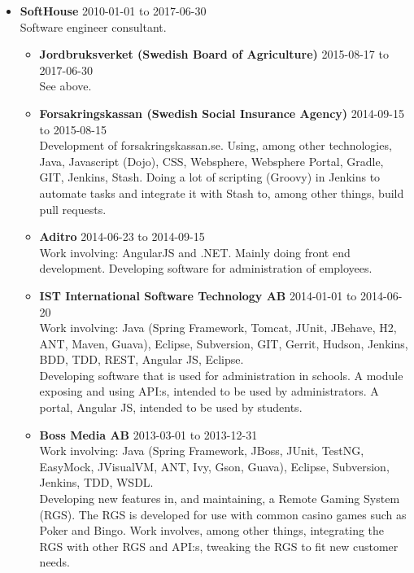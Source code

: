 \documentclass[a4paper]{article}
\begin{document}
\begin{itemize}
 \item \textbf{SoftHouse} 2010-01-01 to 2017-06-30 \\
 Software engineer consultant.
 \begin{itemize}
  \item \textbf{Jordbruksverket (Swedish Board of Agriculture)} 2015-08-17 to 2017-06-30 \\
  See above.
  
  \item \textbf{Forsakringskassan (Swedish Social Insurance Agency)} 2014-09-15 to 2015-08-15 \\
  Development of forsakringskassan.se. Using, among other technologies, Java, Javascript (Dojo), CSS, Websphere, Websphere Portal, Gradle, GIT, Jenkins, Stash. Doing a lot of scripting (Groovy) in Jenkins to automate tasks and integrate it with Stash to, among other things, build pull requests.
  
  \item \textbf{Aditro} 2014-06-23 to 2014-09-15 \\
  Work involving: AngularJS and .NET. Mainly doing front end development.
  Developing software for administration of employees.
  
  \item \textbf{IST International Software Technology AB} 2014-01-01 to 2014-06-20 \\
  Work involving: Java (Spring Framework, Tomcat, JUnit, JBehave, H2, ANT, Maven, Guava), Eclipse, Subversion, GIT, Gerrit, Hudson, Jenkins, BDD, TDD, REST, Angular JS, Eclipse. \\
  Developing software that is used for administration in schools. A module exposing and using API:s, intended to be used by administrators. A portal, Angular JS, intended to be used by students.
  
  \item \textbf{Boss Media AB} 2013-03-01 to 2013-12-31 \\
  Work involving: Java (Spring Framework, JBoss, JUnit, TestNG, EasyMock, JVisualVM, ANT, Ivy, Gson, Guava), Eclipse, Subversion, Jenkins, TDD, WSDL. \\
  Developing new features in, and maintaining, a Remote Gaming System (RGS). The RGS is developed for use with common casino games such as Poker and Bingo. Work involves, among other things, integrating the RGS with other RGS and API:s, tweaking the RGS to fit new customer needs.
  

\end{itemize}
\end{itemize}
\end{document}
